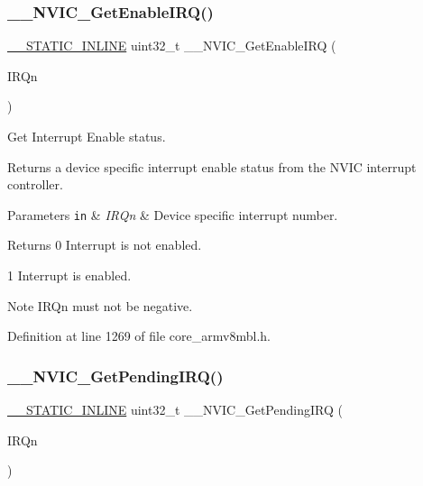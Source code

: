 \subsubsection{\texorpdfstring{\+\_\+\+\_\+\+N\+V\+I\+C\+\_\+\+Get\+Enable\+I\+R\+Q()}{\_\_NVIC\_GetEnableIRQ()}}
{\footnotesize\ttfamily \hyperlink{cmsis__iccarm_8h_aba87361bfad2ae52cfe2f40c1a1dbf9c}{\+\_\+\+\_\+\+S\+T\+A\+T\+I\+C\+\_\+\+I\+N\+L\+I\+NE} uint32\+\_\+t \+\_\+\+\_\+\+N\+V\+I\+C\+\_\+\+Get\+Enable\+I\+RQ (\begin{DoxyParamCaption}\item[{\hyperlink{group___c_m_s_i_s__18_x_x___i_r_q_gaa44deabd252bda567898bae35a086adc}{I\+R\+Qn\+\_\+\+Type}}]{I\+R\+Qn }\end{DoxyParamCaption})}



Get Interrupt Enable status. 

Returns a device specific interrupt enable status from the N\+V\+IC interrupt controller. 
\begin{DoxyParams}[1]{Parameters}
\mbox{\tt in}  & {\em I\+R\+Qn} & Device specific interrupt number. \\
\hline
\end{DoxyParams}
\begin{DoxyReturn}{Returns}
0 Interrupt is not enabled. 

1 Interrupt is enabled. 
\end{DoxyReturn}
\begin{DoxyNote}{Note}
I\+R\+Qn must not be negative. 
\end{DoxyNote}


Definition at line 1269 of file core\+\_\+armv8mbl.\+h.

\mbox{\label{group___c_m_s_i_s___core___n_v_i_c_functions_ga5a92ca5fa801ad7adb92be7257ab9694}} 
\subsubsection{\texorpdfstring{\+\_\+\+\_\+\+N\+V\+I\+C\+\_\+\+Get\+Pending\+I\+R\+Q()}{\_\_NVIC\_GetPendingIRQ()}}
{\footnotesize\ttfamily \hyperlink{cmsis__iccarm_8h_aba87361bfad2ae52cfe2f40c1a1dbf9c}{\+\_\+\+\_\+\+S\+T\+A\+T\+I\+C\+\_\+\+I\+N\+L\+I\+NE} uint32\+\_\+t \+\_\+\+\_\+\+N\+V\+I\+C\+\_\+\+Get\+Pending\+I\+RQ (\begin{DoxyParamCaption}\item[{\hyperlink{group___c_m_s_i_s__18_x_x___i_r_q_gaa44deabd252bda567898bae35a086adc}{I\+R\+Qn\+\_\+\+Type}}]{I\+R\+Qn }\end{DoxyParamCaption})}



